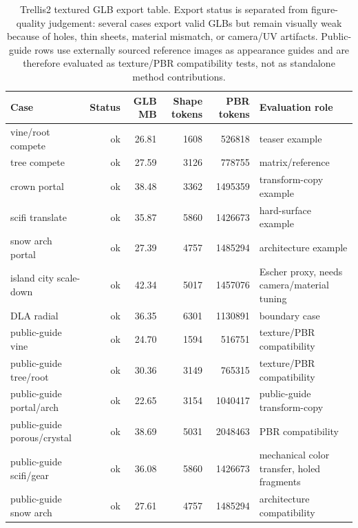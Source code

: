 \documentclass[sigconf,anonymous,review]{acmart}
\begin{document}


\begin{table}[t]
  \centering
  \caption{Trellis2 textured GLB export table. Export status is separated from figure-quality judgement: several cases export valid GLBs but remain visually weak because of holes, thin sheets, material mismatch, or camera/UV artifacts. Public-guide rows use externally sourced reference images as appearance guides and are therefore evaluated as texture/PBR compatibility tests, not as standalone method contributions.}
  \label{tab:texture-qa}
  \begin{tabular}{lrrrrl}
    \hline
    Case & Status & GLB MB & Shape tokens & PBR tokens & Evaluation role \\
    \hline
    vine/root compete & ok & 26.81 & 1608 & 526818 & teaser example \\
    tree compete & ok & 27.59 & 3126 & 778755 & matrix/reference \\
    crown portal & ok & 38.48 & 3362 & 1495359 & transform-copy example \\
    scifi translate & ok & 35.87 & 5860 & 1426673 & hard-surface example \\
    snow arch portal & ok & 27.39 & 4757 & 1485294 & architecture example \\
    island city scale-down & ok & 42.34 & 5017 & 1457076 & Escher proxy, needs camera/material tuning \\
    DLA radial & ok & 36.35 & 6301 & 1130891 & boundary case \\
    public-guide vine & ok & 24.70 & 1594 & 516751 & texture/PBR compatibility \\
    public-guide tree/root & ok & 30.36 & 3149 & 765315 & texture/PBR compatibility \\
    public-guide portal/arch & ok & 22.65 & 3154 & 1040417 & public-guide transform-copy \\
    public-guide porous/crystal & ok & 38.69 & 5031 & 2048463 & PBR compatibility \\
    public-guide scifi/gear & ok & 36.08 & 5860 & 1426673 & mechanical color transfer, holed fragments \\
    public-guide snow arch & ok & 27.61 & 4757 & 1485294 & architecture compatibility \\
    \hline
  \end{tabular}
\end{table}
\end{document}
